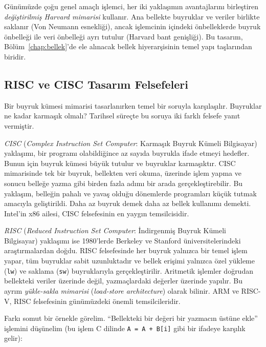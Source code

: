 Günümüzde çoğu genel amaçlı işlemci, her iki yaklaşımın avantajlarını birleştiren \emph{değiştirilmiş Harvard mimarisi} kullanır. Ana bellekte buyruklar ve veriler birlikte saklanır (Von Neumann esnekliği), ancak işlemcinin içindeki önbelleklerde buyruk önbelleği ile veri önbelleği ayrı tutulur (Harvard bant genişliği). Bu tasarım, Bölüm~\ref{chap:bellek}'de ele alınacak bellek hiyerarşisinin temel yapı taşlarından biridir.

\subsection{RISC ve CISC Tasarım Felsefeleri}
\label{subsec:risc-cisc}

Bir buyruk kümesi mimarisi tasarlanırken temel bir soruyla karşılaşılır. Buyruklar ne kadar karmaşık olmalı? Tarihsel süreçte bu soruya iki farklı felsefe yanıt vermiştir.

\emph{CISC} (\emph{Complex Instruction Set Computer}: Karmaşık Buyruk Kümeli Bilgisayar) yaklaşımı, bir programı olabildiğince az sayıda buyrukla ifade etmeyi hedefler. Bunun için buyruk kümesi büyük tutulur ve buyruklar karmaşıktır. CISC mimarisinde tek bir buyruk, bellekten veri okuma, üzerinde işlem yapma ve sonucu belleğe yazma gibi birden fazla adımı bir arada gerçekleştirebilir. Bu yaklaşım, belleğin pahalı ve yavaş olduğu dönemlerde programları küçük tutmak amacıyla geliştirildi. Daha az buyruk demek daha az bellek kullanımı demekti. Intel'in x86 ailesi, CISC felsefesinin en yaygın temsilcisidir.

\emph{RISC} (\emph{Reduced Instruction Set Computer}: İndirgenmiş Buyruk Kümeli Bilgisayar) yaklaşımı ise 1980'lerde Berkeley ve Stanford üniversitelerindeki araştırmalardan doğdu. RISC felsefesinde her buyruk yalnızca bir temel işlem yapar, tüm buyruklar sabit uzunluktadır ve bellek erişimi yalnızca özel yükleme (\texttt{lw}) ve saklama (\texttt{sw}) buyruklarıyla gerçekleştirilir. Aritmetik işlemler doğrudan bellekteki veriler üzerinde değil, yazmaçlardaki değerler üzerinde yapılır. Bu ayrım \emph{yükle-sakla mimarisi} (\emph{load-store architecture}) olarak bilinir. ARM ve RISC-V, RISC felsefesinin günümüzdeki önemli temsilcileridir.

Farkı somut bir örnekle görelim. ``Bellekteki bir değeri bir yazmacın üstüne ekle'' işlemini düşünelim (bu işlem C dilinde \texttt{A = A + B[i]} gibi bir ifadeye karşılık gelir):

